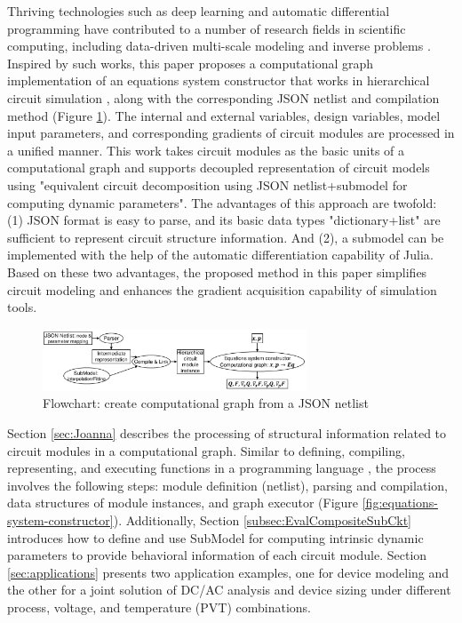 Thriving technologies such as deep learning \cite{goodfellow2016deep} and automatic differential programming \cite{baydin2018automatic} have contributed to a number of research fields in scientific computing, including data-driven multi-scale modeling and inverse problems \cite{zhang2018deep,long2018pde,long2019pde}. Inspired by such works, this paper proposes a computational graph implementation of an equations system constructor that works in hierarchical circuit simulation \cite{fijnvandraat2002time,ter1999numerical,mukherjee1999hierarchical,tcherniaev2003transistor}, along with the corresponding JSON netlist and compilation method (Figure \ref{fig:flowchart}). The internal and external variables, design variables, model input parameters, and corresponding gradients of circuit modules are processed in a unified manner.
This work takes circuit modules as the basic units of a computational graph and supports decoupled representation of circuit models using "equivalent circuit decomposition using JSON netlist+submodel for computing dynamic parameters". The advantages of this approach are twofold: (1) JSON format is easy to parse, and its basic data types "dictionary+list" are sufficient to represent circuit structure information. And (2), a submodel can be implemented with the help of the automatic differentiation capability of Julia\cite{Bezanson_Julia_A_fresh_2017}. Based on these two advantages, the proposed method in this paper simplifies circuit modeling and enhances the gradient acquisition capability of simulation tools.
\begin{figure}[htpb]
	\centering
	\includegraphics[width=0.7\textwidth]{fig/flowchart.pdf}
	\caption{Flowchart: create computational graph from a JSON netlist}
	\label{fig:flowchart}
\end{figure}

Section \ref{sec:Joanna} describes the processing of structural information related to circuit modules in a computational graph. Similar to defining, compiling, representing, and executing functions in a programming language \cite{aho2007compilers,muchnick1997advanced,appel2004modern}, the process involves the following steps:
module definition (netlist), parsing and compilation, data structures of module instances, and graph executor (Figure \ref{fig:equations-system-constructor}). Additionally, Section \ref{subsec:EvalCompositeSubCkt} introduces how to define and use SubModel for computing intrinsic dynamic parameters to provide behavioral information of each circuit module. Section \ref{sec:applications} presents two application examples, one for device modeling and the other for a joint solution of DC/AC analysis and device sizing under different process, voltage, and temperature (PVT) combinations.



